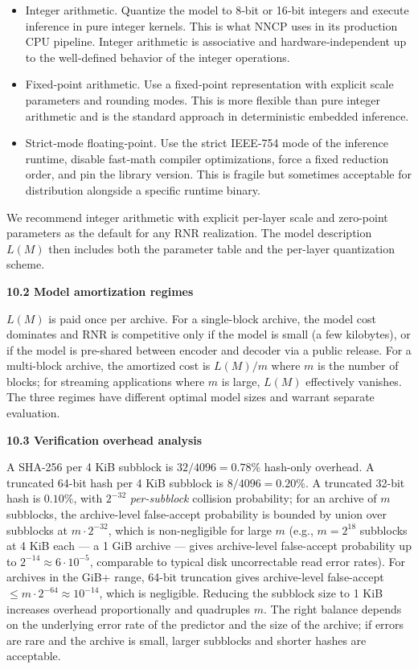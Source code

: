 \documentclass[
]{article}
\begin{document}
\begin{itemize}
\item
  Integer arithmetic. Quantize the model to 8‑bit or 16‑bit integers and
  execute inference in pure integer kernels. This is what NNCP uses in
  its production CPU pipeline. Integer arithmetic is associative and
  hardware‑independent up to the well‑defined behavior of the integer
  operations.
\item
  Fixed‑point arithmetic. Use a fixed‑point representation with explicit
  scale parameters and rounding modes. This is more flexible than pure
  integer arithmetic and is the standard approach in deterministic
  embedded inference.
\item
  Strict‑mode floating‑point. Use the strict IEEE‑754 mode of the
  inference runtime, disable fast‑math compiler optimizations, force a
  fixed reduction order, and pin the library version. This is fragile
  but sometimes acceptable for distribution alongside a specific runtime
  binary.
\end{itemize}

We recommend integer arithmetic with explicit per-layer scale and
zero-point parameters as the default for any RNR realization. The
model description $L(M)$ then includes both the parameter table and
the per-layer quantization scheme.

\textbf{10.2 Model amortization regimes}

$L(M)$ is paid once per archive. For a single-block archive, the model
cost dominates and RNR is competitive only if the model is small (a
few kilobytes), or if the model is pre-shared between encoder and
decoder via a public release. For a multi-block archive, the amortized
cost is $L(M)/m$ where $m$ is the number of blocks; for streaming
applications where $m$ is large, $L(M)$ effectively vanishes. The
three regimes have different optimal model sizes and warrant separate
evaluation.

\textbf{10.3 Verification overhead analysis}

A SHA-256 per 4 KiB subblock is $32/4096 = 0.78\%$ hash-only overhead.
A truncated 64-bit hash per 4 KiB subblock is $8/4096 = 0.20\%$. A
truncated 32-bit hash is $0.10\%$, with $2^{-32}$ \emph{per-subblock}
collision probability; for an archive of $m$ subblocks, the
archive-level false-accept probability is bounded by union over
subblocks at $m \cdot 2^{-32}$, which is non-negligible for large
$m$ (e.g., $m = 2^{18}$ subblocks at 4 KiB each --- a 1 GiB archive
--- gives archive-level false-accept probability up to $2^{-14}
\approx 6 \cdot 10^{-5}$, comparable to typical disk uncorrectable
read error rates). For archives in the GiB+ range, 64-bit
truncation gives archive-level false-accept $\leq m \cdot 2^{-64}
\approx 10^{-14}$, which is negligible. Reducing the subblock size
to 1 KiB increases overhead proportionally and quadruples $m$. The
right balance depends on the underlying error rate of the
predictor and the size of the archive; if errors are rare and the
archive is small, larger subblocks and shorter hashes are
acceptable.
\end{document}
